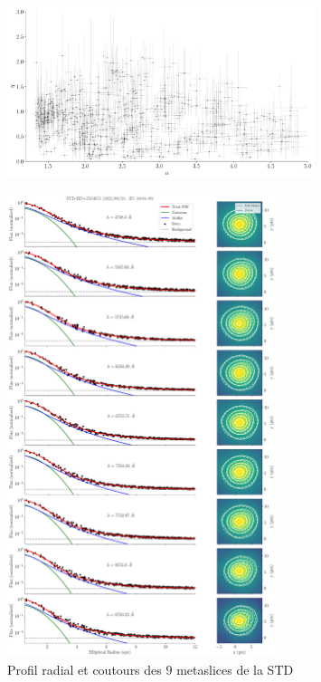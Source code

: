 \documentclass[../main/main.tex]{subfiles}
\begin{document}


\begin{figure}[ht]
  \centering
  \includegraphics[width=0.8\textwidth]{../figures/06_irf/STD_correlation_betasigmafixed.pdf}
  \caption[]{}
  \label{fig:}
\end{figure}



\begin{figure}[ht]
  \centering
  \includegraphics[width=0.7\textwidth]{../figures/06_irf/STD_profile_allmeta.pdf}
  \caption[]{Profil radial et coutours des $9$ metaslices de la STD}
  \label{fig:}
\end{figure}
\end{document}
